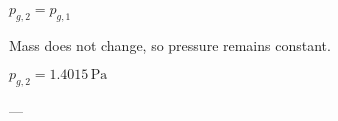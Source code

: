 \( p_{g,2} = p_{g,1} \)  

Mass does not change, so pressure remains constant.  

\( p_{g,2} = 1.4015 \, \text{Pa} \)  

---